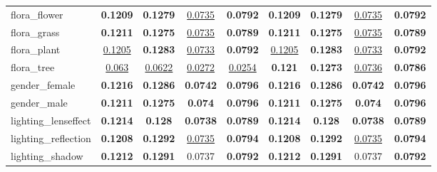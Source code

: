 \begin{center}
\begin{supertabular}{lcccc||cccc}
\small{flora\_flower} & \textbf{\scriptsize{0.1209}} & \textbf{\scriptsize{0.1279}} & \underline{\scriptsize{0.0735}} & \textbf{\scriptsize{0.0792}}& \textbf{\scriptsize{0.1209}} & \textbf{\scriptsize{0.1279}} & \underline{\scriptsize{0.0735}} & \textbf{\scriptsize{0.0792}}\\
\small{flora\_grass} & \textbf{\scriptsize{0.1211}} & \textbf{\scriptsize{0.1275}} & \underline{\scriptsize{0.0735}} & \textbf{\scriptsize{0.0789}}& \textbf{\scriptsize{0.1211}} & \textbf{\scriptsize{0.1275}} & \underline{\scriptsize{0.0735}} & \textbf{\scriptsize{0.0789}}\\
\small{flora\_plant} & \underline{\scriptsize{0.1205}} & \textbf{\scriptsize{0.1283}} & \underline{\scriptsize{0.0733}} & \textbf{\scriptsize{0.0792}}& \underline{\scriptsize{0.1205}} & \textbf{\scriptsize{0.1283}} & \underline{\scriptsize{0.0733}} & \textbf{\scriptsize{0.0792}}\\
\small{flora\_tree} & \underline{\scriptsize{0.063}} & \underline{\scriptsize{0.0622}} & \underline{\scriptsize{0.0272}} & \underline{\scriptsize{0.0254}}& \textbf{\scriptsize{0.121}} & \textbf{\scriptsize{0.1273}} & \underline{\scriptsize{0.0736}} & \textbf{\scriptsize{0.0786}}\\
\small{gender\_female} & \textbf{\scriptsize{0.1216}} & \textbf{\scriptsize{0.1286}} & \textbf{\scriptsize{0.0742}} & \textbf{\scriptsize{0.0796}}& \textbf{\scriptsize{0.1216}} & \textbf{\scriptsize{0.1286}} & \textbf{\scriptsize{0.0742}} & \textbf{\scriptsize{0.0796}}\\
\small{gender\_male} & \textbf{\scriptsize{0.1211}} & \textbf{\scriptsize{0.1275}} & \textbf{\scriptsize{0.074}} & \textbf{\scriptsize{0.0796}}& \textbf{\scriptsize{0.1211}} & \textbf{\scriptsize{0.1275}} & \textbf{\scriptsize{0.074}} & \textbf{\scriptsize{0.0796}}\\
\small{lighting\_lenseffect} & \textbf{\scriptsize{0.1214}} & \textbf{\scriptsize{0.128}} & \textbf{\scriptsize{0.0738}} & \textbf{\scriptsize{0.0789}}& \textbf{\scriptsize{0.1214}} & \textbf{\scriptsize{0.128}} & \textbf{\scriptsize{0.0738}} & \textbf{\scriptsize{0.0789}}\\
\small{lighting\_reflection} & \textbf{\scriptsize{0.1208}} & \textbf{\scriptsize{0.1292}} & \underline{\scriptsize{0.0735}} & \textbf{\scriptsize{0.0794}}& \textbf{\scriptsize{0.1208}} & \textbf{\scriptsize{0.1292}} & \underline{\scriptsize{0.0735}} & \textbf{\scriptsize{0.0794}}\\
\small{lighting\_shadow} & \textbf{\scriptsize{0.1212}} & \textbf{\scriptsize{0.1291}} & {\scriptsize{0.0737}} & \textbf{\scriptsize{0.0792}}& \textbf{\scriptsize{0.1212}} & \textbf{\scriptsize{0.1291}} & {\scriptsize{0.0737}} & \textbf{\scriptsize{0.0792}}\\

\end{supertabular}
\end{center}
